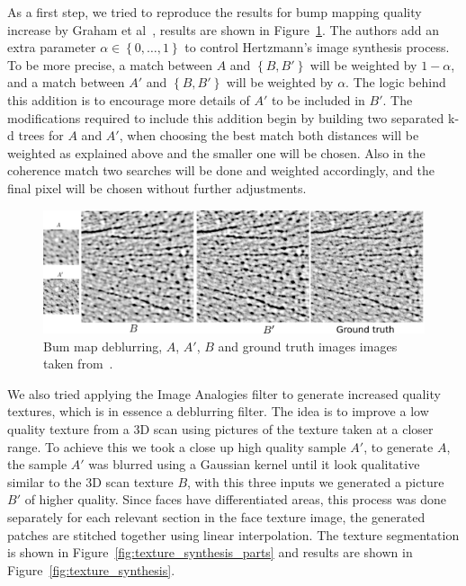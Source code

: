 As a first step, we tried to reproduce the results for bump mapping quality increase by Graham et al~\cite{Graham2013}, results are shown in Figure~\ref{fig:bump_maps}.
The authors add an extra parameter $\alpha \in \left\lbrace 0, \ldots, 1 \right\rbrace$ to control Hertzmann's image synthesis process.
To be more precise, a match between $A$ and $\left\lbrace B,B' \right\rbrace$ will be weighted by $1 - \alpha$, and a match between $A'$ and $\left\lbrace B,B' \right\rbrace$ will be weighted by $\alpha$.
The logic behind this addition is to encourage more details of $A'$ to be included in $B'$.
The modifications required to include this addition begin by building two separated k-d trees for $A$ and $A'$, when choosing the best match both distances will be weighted as explained above and the smaller one will be chosen.
Also in the coherence match two searches will be done and weighted accordingly, and the final pixel will be chosen without further adjustments.

\begin{figure}[htbp!]
\centering
\includegraphics[width=\textwidth]{img/bump_maps}
	\caption{ Bum map deblurring, $A$, $A'$, $B$ and ground truth images images taken from~\cite{Graham2013}.}
	\label{fig:bump_maps}
\end{figure}

We also tried applying the Image Analogies filter to generate increased quality textures, which is in essence a deblurring filter.
The idea is to improve a low quality texture from a 3D scan using pictures of the texture taken at a closer range.
To achieve this we took a close up high quality sample $A'$, to generate $A$, the sample $A'$ was blurred using a Gaussian kernel until it look qualitative similar to the 3D scan texture $B$, with this three inputs we generated a picture $B'$ of higher quality.
Since faces have differentiated areas, this process was done separately for each relevant section in the face texture image, the generated patches are stitched together using linear interpolation.
The texture segmentation is shown in Figure~\ref{fig:texture_synthesis_parts} and results are shown in Figure~\ref{fig:texture_synthesis}.

